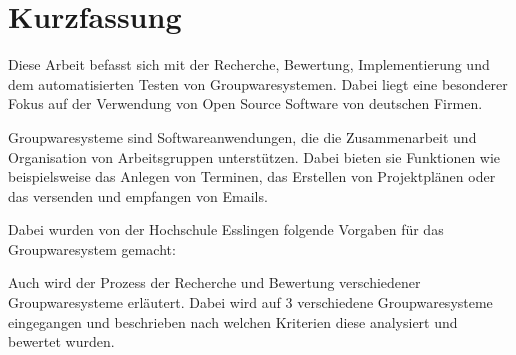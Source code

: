 \chapter{Kurzfassung}

Diese Arbeit befasst sich mit der Recherche, Bewertung, Implementierung und dem automatisierten Testen von Groupwaresystemen.
Dabei liegt eine besonderer Fokus auf der Verwendung von Open Source Software von deutschen Firmen.

Groupwaresysteme sind Softwareanwendungen, die die Zusammenarbeit und Organisation von Arbeitsgruppen unterstützen.
Dabei bieten sie Funktionen wie beispielsweise das Anlegen von Terminen, das Erstellen von Projektplänen oder das versenden und empfangen von Emails.


Dabei wurden von der Hochschule Esslingen folgende Vorgaben für das Groupwaresystem gemacht:

Auch wird der Prozess der Recherche und Bewertung verschiedener Groupwaresysteme erläutert.
Dabei wird auf 3 verschiedene Groupwaresysteme eingegangen und beschrieben nach welchen Kriterien diese analysiert und bewertet wurden.

